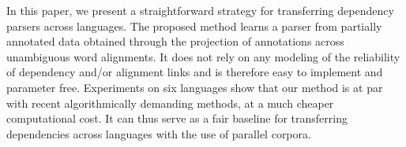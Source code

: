 In this paper, we present a straightforward strategy for transferring dependency parsers across languages.  The proposed method learns a parser from partially annotated data obtained through the projection of annotations across unambiguous word alignments. It does not rely on any modeling of the reliability of dependency and/or alignment links and is therefore easy to implement and parameter free.  Experiments on six languages show that our method is at par with recent algorithmically demanding methods, at a much cheaper computational cost. It can thus serve as a fair baseline for transferring dependencies across languages with the use of parallel corpora.
